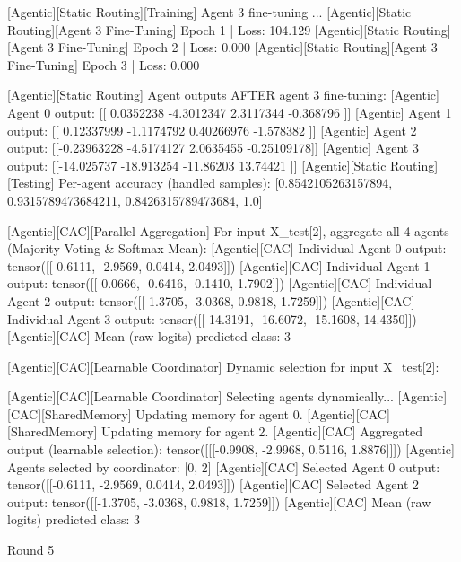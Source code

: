 [Agentic][Static Routing][Training] Agent 3 fine-tuning ...
[Agentic][Static Routing][Agent 3 Fine-Tuning] Epoch 1 | Loss: 104.129
[Agentic][Static Routing][Agent 3 Fine-Tuning] Epoch 2 | Loss: 0.000
[Agentic][Static Routing][Agent 3 Fine-Tuning] Epoch 3 | Loss: 0.000

[Agentic][Static Routing] Agent outputs AFTER agent 3 fine-tuning:
[Agentic] Agent 0 output: [[ 0.0352238 -4.3012347  2.3117344 -0.368796 ]]
[Agentic] Agent 1 output: [[ 0.12337999 -1.1174792   0.40266976 -1.578382  ]]
[Agentic] Agent 2 output: [[-0.23963228 -4.5174127   2.0635455  -0.25109178]]
[Agentic] Agent 3 output: [[-14.025737 -18.913254 -11.86203   13.74421 ]]
[Agentic][Static Routing][Testing] Per-agent accuracy (handled samples): [0.8542105263157894, 0.9315789473684211, 0.8426315789473684, 1.0]

[Agentic][CAC][Parallel Aggregation] For input X_test[2], aggregate all 4 agents (Majority Voting & Softmax Mean):
[Agentic][CAC] Individual Agent 0 output: tensor([[-0.6111, -2.9569,  0.0414,  2.0493]])
[Agentic][CAC] Individual Agent 1 output: tensor([[ 0.0666, -0.6416, -0.1410,  1.7902]])
[Agentic][CAC] Individual Agent 2 output: tensor([[-1.3705, -3.0368,  0.9818,  1.7259]])
[Agentic][CAC] Individual Agent 3 output: tensor([[-14.3191, -16.6072, -15.1608,  14.4350]])
[Agentic][CAC] Mean (raw logits) predicted class: 3

[Agentic][CAC][Learnable Coordinator] Dynamic selection for input X_test[2]:

[Agentic][CAC][Learnable Coordinator] Selecting agents dynamically...
[Agentic][CAC][SharedMemory] Updating memory for agent 0.
[Agentic][CAC][SharedMemory] Updating memory for agent 2.
[Agentic][CAC] Aggregated output (learnable selection): tensor([[[-0.9908, -2.9968,  0.5116,  1.8876]]])
[Agentic] Agents selected by coordinator: [0, 2]
[Agentic][CAC] Selected Agent 0 output: tensor([[-0.6111, -2.9569,  0.0414,  2.0493]])
[Agentic][CAC] Selected Agent 2 output: tensor([[-1.3705, -3.0368,  0.9818,  1.7259]])
[Agentic][CAC] Mean (raw logits) predicted class: 3

Round 5

